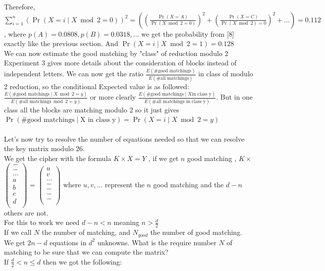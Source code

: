 \documentclass{article}
\begin{document}
Therefore, $\sum_{i=1}^{n}{(\Pr (X=i \mid X \bmod 2 = 0))^{2}} = ((\frac{\Pr(X=A)}{\Pr(X \bmod 2 = 0)})^{2} + (\frac{\Pr(X=C)}{\Pr(X \bmod 2) = 0})^{2} + ... )= 0.112$ , where $p(A)=0.0808 , p(B)=0.0318 , ...$  we get the probability from [8] exactly like the previous section.
And $\Pr(X=i \mid X \bmod 2 = 1) = 0.128$\\
We can now estimate the good matching by "class" of reduction modulo 2
Experiment 3 gives more details about the consideration of blocks instead of independent letters.
We can now get the ratio $\frac{E(\# \text{good matchings})}{E(\# \text{all matchings})}$ in class of modulo 2 reduction, so the conditional Expected value is as followed: $\frac{E(\# \text{good matchings} \mid X \bmod 2 = y)}{E(\# \text{all matchings} \bmod 2 = y)}$ or more clearly $\frac{E(\# \text{good matchings} \mid X \text{in class y})}{E(\# \text{all matchings in class y})}$. But in one class all the blocks are matching modulo 2 so it just gives $\Pr(\# \text{good matchings} \mid \text{X in class y})  = \Pr (X=i \mid X \bmod 2 = y) $\\
\\
Let's now try to resolve the number of equations needed so that we can resolve the key matrix modulo 26.\\
We get the cipher with the formula $ K \times X = Y$ , if we get $n$ good matching , $ K \times $  $\begin{pmatrix}
  - \\
  - \\
  ... \\
  a \\
	b\\
	c\\
	d\\
 \end{pmatrix} $
 = $\begin{pmatrix}
  u \\
  v \\
  ... \\
  - \\
	-\\
	-\\
	-\\
 \end{pmatrix}$
where $ u , v , ... $ represent the $n$ good matching and the $d-n $ others are not.\\
For this to work we need $d-n < n $ meaning $n > \frac{d}{2}$\\
If we call $N$ the number of matching, and $N_{good}$ the number of good matching.\\
We get $2n-d$ equations in $d^2$ unknowns.
What is the require number $N$ of matching to be sure that we can compute the matrix?\\
If $ \frac{d}{2} < n \leq d $ then we got the following:
\end{document}
